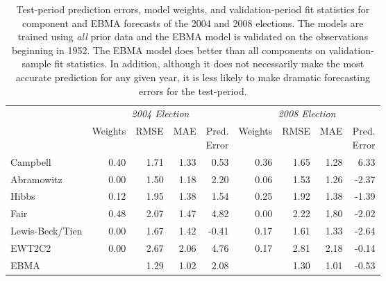 \documentclass[12pt,fullpage,endnotes]{article}
\begin{document}
\begin{table}[h!]
  \caption{\footnotesize Test-period prediction errors, model weights, and validation-period fit 
    statistics for component and EBMA forecasts  of the 2004 and 2008  
    elections. The models are trained using \textit{all} prior data and the 
    EBMA model is validated on the observations beginning in 1952.  
    The EBMA model does better than all components on 
    validation-sample fit statistics.  In addition, although it does not 
    necessarily make the most accurate prediction for any given year,
    it is less likely to make  dramatic forecasting errors for the test-period.}
\label{Pres-Year-Res} \small
\begin{center}
\begin{tabular}{l rrrrrrrr}	
  \toprule
   &\multicolumn{4}{c}{\textit{2004 Election}} &\multicolumn{4}{c}{\textit{2008 Election}} \\ 
 &	Weights&	RMSE &MAE &\shortstack{Pred. \\ Error}
 &Weights&	RMSE&	MAE &  \shortstack{Pred.\\  Error}\\
\midrule
 Campbell               & 0.40 & 1.71 & 1.33 & 0.53 & 0.36 & 1.65 & 1.28 & 6.33\\
  Abramowitz        	& 0.00 & 1.50 & 1.18 & 2.20 & 0.06 & 1.53 & 1.26 & -2.37\\
  Hibbs                   	& 0.12 & 1.95 & 1.38 & 1.54 & 0.25 & 1.92 & 1.38 & -1.39\\
  Fair                      	& 0.48 & 2.07 & 1.47 & 4.82  & 0.00 & 2.22 & 1.80 & -2.02 \\
  Lewis-Beck/Tien 	& 0.00 & 1.67 & 1.42 & -0.41& 0.17 & 1.61 & 1.33 & -2.64\\
  EWT2C2 		& 0.00 & 2.67 & 2.06 & 4.76  & 0.17 & 2.81 & 2.18 & -0.14\\
   EBMA                    	&  & 1.29 & 1.02 & 2.08 &  & 1.30 & 1.01 & -0.53\\
\bottomrule
\end{tabular}
 \end{center}
 \end{table}
 
\end{document}
